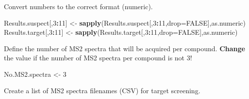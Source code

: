 \documentclass[]{article}
\newenvironment{Shaded}{\begin{snugshade}}{\end{snugshade}}
\newcommand{\KeywordTok}[1]{\textcolor[rgb]{0.13,0.29,0.53}{\textbf{#1}}}
\newcommand{\DataTypeTok}[1]{\textcolor[rgb]{0.13,0.29,0.53}{#1}}
\newcommand{\DecValTok}[1]{\textcolor[rgb]{0.00,0.00,0.81}{#1}}
\newcommand{\StringTok}[1]{\textcolor[rgb]{0.31,0.60,0.02}{#1}}
\newcommand{\OtherTok}[1]{\textcolor[rgb]{0.56,0.35,0.01}{#1}}
\newcommand{\OperatorTok}[1]{\textcolor[rgb]{0.81,0.36,0.00}{\textbf{#1}}}
\newcommand{\NormalTok}[1]{#1}
\begin{document}
Convert numbers to the correct format (numeric).

\begin{Shaded}
\begin{Highlighting}[]
\NormalTok{  Results.suspect[,}\DecValTok{3}\OperatorTok{:}\DecValTok{11}\NormalTok{] <-}\StringTok{ }\KeywordTok{sapply}\NormalTok{(Results.suspect[,}\DecValTok{3}\OperatorTok{:}\DecValTok{11}\NormalTok{,}\DataTypeTok{drop=}\OtherTok{FALSE}\NormalTok{],as.numeric)}
\NormalTok{  Results.target[,}\DecValTok{3}\OperatorTok{:}\DecValTok{11}\NormalTok{] <-}\StringTok{ }\KeywordTok{sapply}\NormalTok{(Results.target[,}\DecValTok{3}\OperatorTok{:}\DecValTok{11}\NormalTok{,}\DataTypeTok{drop=}\OtherTok{FALSE}\NormalTok{],as.numeric)}
\end{Highlighting}
\end{Shaded}

Define the number of MS2 spectra that will be acquired per compound.
\textbf{Change} the value if the number of MS2 spectra per compound is
not 3!

\begin{Shaded}
\begin{Highlighting}[]
\NormalTok{  No.MS2.spectra <-}\StringTok{ }\DecValTok{3}
\end{Highlighting}
\end{Shaded}

Create a list of MS2 spectra filenames (CSV) for target screening.
\end{document}
